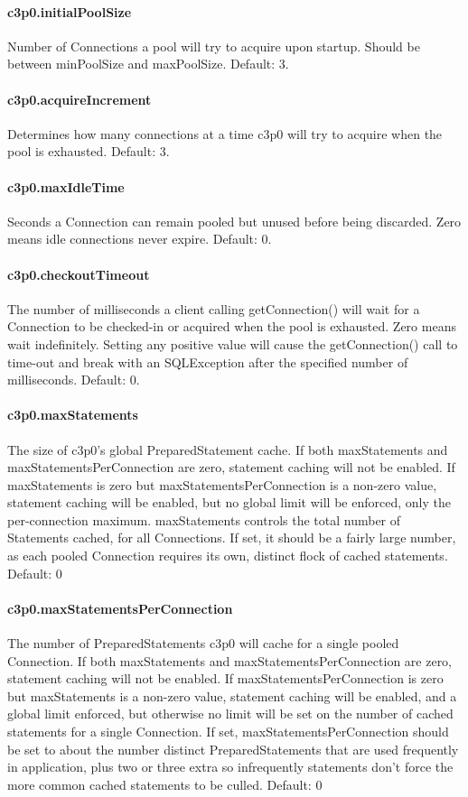 \paragraph{c3p0.initialPoolSize}
Number of Connections a pool will try to acquire upon startup. Should be between
minPoolSize and maxPoolSize.
Default: 3.

\paragraph{c3p0.acquireIncrement}
Determines how many connections at a time c3p0 will try to acquire when the pool
is exhausted.
Default: 3.

\paragraph{c3p0.maxIdleTime}
Seconds a Connection can remain pooled but unused before being discarded. Zero
means idle connections never expire.
Default: 0.

\paragraph{c3p0.checkoutTimeout}
The number of milliseconds a client calling getConnection() will wait for a Connection
to be checked-in or acquired when the pool is exhausted. Zero means wait indefinitely.
Setting any positive value will cause the getConnection() call to time-out and
break with an SQLException after the specified number of milliseconds.
Default: 0.

\paragraph{c3p0.maxStatements}
The size of c3p0's global PreparedStatement cache. If both maxStatements and
maxStatementsPerConnection are zero, statement caching will not be enabled.
If maxStatements is zero but maxStatementsPerConnection is a non-zero value,
statement caching will be enabled, but no global limit will be enforced, only
the per-connection maximum. maxStatements controls the total number of Statements
cached, for all Connections. If set, it should be a fairly large number, as each
pooled Connection requires its own, distinct flock of cached statements.
Default: 0

\paragraph{c3p0.maxStatementsPerConnection}
The number of PreparedStatements c3p0 will cache for a single pooled Connection.
If both maxStatements and maxStatementsPerConnection are zero, statement caching
will not be enabled. If maxStatementsPerConnection is zero but maxStatements is
a non-zero value, statement caching will be enabled, and a global limit enforced,
but otherwise no limit will be set on the number of cached statements for a single
Connection. If set, maxStatementsPerConnection should be set to about the number
distinct PreparedStatements that are used frequently in application, plus
two or three extra so infrequently statements don't force the more common cached
statements to be culled.
Default: 0

